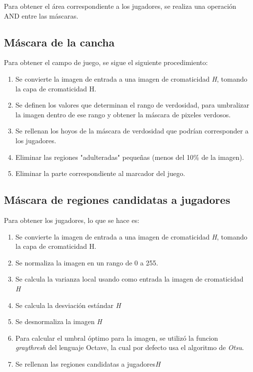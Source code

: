 \documentclass{IEEEtran}
\begin{document}
Para obtener el \'area correspondiente a los jugadores, se realiza una operaci\'on AND entre las m\'ascaras.

\subsection{M\'ascara de la cancha}

Para obtener el campo de juego, se sigue el siguiente procedimiento:

\begin{enumerate}
\item Se convierte la imagen de entrada a una imagen de cromaticidad \emph{H}, tomando la capa de cromaticidad H.
\item Se definen los valores que determinan el rango de verdosidad, para umbralizar la imagen dentro de ese rango y obtener la m\'ascara de pixeles verdosos.
\item Se rellenan los hoyos de la m\'ascara de verdosidad que podr\'ian corresponder a los jugadores.
\item Eliminar las regiones "adulteradas" peque\~nas (menos del 10\% de la imagen).
\item Eliminar la parte correspondiente al marcador del juego.
\end{enumerate}

\subsection{M\'ascara de regiones candidatas a jugadores}

Para obtener los jugadores, lo que se hace es:

\begin{enumerate}
\item Se convierte la imagen de entrada a una imagen de cromaticidad \emph{H}, tomando la capa de cromaticidad H.
\item Se normaliza la imagen en un rango de 0 a 255.
\item Se calcula la varianza local usando como entrada la imagen de cromaticidad \emph{H}
\item Se calcula la desviaci\'on est\'andar \emph{H}
\item Se desnormaliza la imagen \emph{H}
\item Para calcular el umbral \'optimo para la imagen, se utiliz\'o la funcion \emph{graythresh} del lenguaje Octave, la cual por defecto usa el algoritmo de \emph{Otsu}.
\item  Se rellenan las regiones candidatas a jugadores\emph{H}
\end{enumerate}
\end{document}
